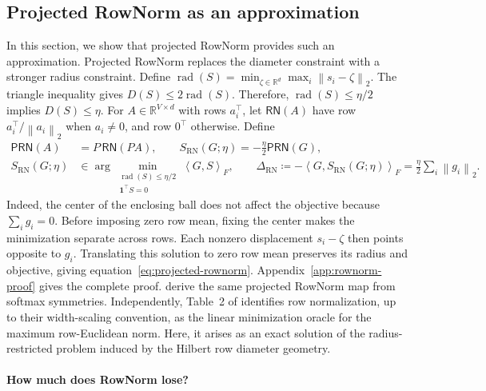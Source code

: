 \documentclass[anon]{opt2026} %
\newcommand{\R}{\mathbb{R}}
\newcommand{\one}{\mathbf{1}}
\newcommand{\norm}[1]{\left\lVert #1\right\rVert}
\newcommand{\inner}[2]{\left\langle #1,#2\right\rangle}
\begin{document}
\subsection{Projected RowNorm as an approximation}
\label{sec:projected-rownorm}

In this section, we show that projected RowNorm provides such an approximation.
Projected RowNorm replaces the diameter constraint with a stronger radius constraint.
Define $\operatorname{rad}(S)=\min_{\zeta\in\R^d}\max_i\norm{s_i-\zeta}_2$.
The triangle inequality gives $D(S)\leq2\operatorname{rad}(S)$.
Therefore, $\operatorname{rad}(S)\leq\eta/2$ implies $D(S)\leq\eta$. For $A\in\R^{V\times d}$ with rows $a_i^\top$, let $\mathsf{RN}(A)$ have row $a_i^\top/\norm{a_i}_2$ when $a_i\neq0$, and row $0^\top$ otherwise.
Define
\begin{equation}
\boxed{
\begin{aligned}
\mathsf{PRN}(A)
&=P\,\mathsf{RN}(PA),
\qquad
S_{\mathrm{RN}}(G;\eta)
=-\frac{\eta}{2}\mathsf{PRN}(G),
\\
S_{\mathrm{RN}}(G;\eta)
&\in
\arg\min_{\substack{\operatorname{rad}(S)\leq\eta/2\\
                    \one^\top S=0}}
\inner{G}{S}_F,
\qquad
\Delta_{\mathrm{RN}}
\coloneqq
-\inner{G}{S_{\mathrm{RN}}(G;\eta)}_F
=
\frac{\eta}{2}\sum_i\norm{g_i}_2.
\end{aligned}
}
\label{eq:projected-rownorm}
\end{equation}
Indeed, the center of the enclosing ball does not affect the objective because $\sum_i g_i=0$.
Before imposing zero row mean, fixing the center makes the minimization separate across rows. Each nonzero displacement $s_i-\zeta$ then points opposite to $g_i$.
Translating this solution to zero row mean preserves its radius and objective, giving equation~\ref{eq:projected-rownorm}. Appendix~\ref{app:rownorm-proof} gives the complete proof.
\citet{lau2026symmetry} derive the same projected RowNorm map from softmax symmetries.
Independently, Table~2 of \citet{pethick2025trainingdeeplearningmodels} identifies row normalization, up to their width-scaling convention, as the linear minimization oracle for the maximum row-Euclidean norm.
Here, it arises as an exact solution of the radius-restricted problem induced by the Hilbert row diameter geometry.


\paragraph{How much does RowNorm lose?}
\label{sec:rownorm-comparison}
\end{document}
